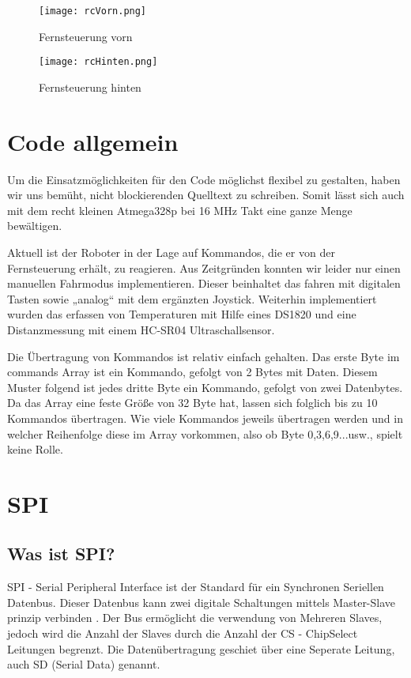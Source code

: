 \documentclass[12pt]{article}
\begin{document}
\begin{figure}[h]
	\texttt{[image: rcVorn.png]}
	\centering
	\caption{Fernsteuerung vorn}
\end{figure}

\begin{figure}[h]
	\texttt{[image: rcHinten.png]}
	\centering
	\caption{Fernsteuerung hinten}
\end{figure}

\newpage
\section{Code allgemein}%

Um die Einsatzmöglichkeiten für den Code möglichst flexibel zu gestalten, haben wir uns bemüht, nicht blockierenden Quelltext zu schreiben.
Somit lässt sich auch mit dem recht kleinen Atmega328p bei 16 MHz Takt eine ganze Menge bewältigen.

Aktuell ist der Roboter in der Lage auf Kommandos, die er von der Fernsteuerung erhält, zu reagieren. Aus Zeitgründen konnten wir leider nur einen manuellen Fahrmodus implementieren. Dieser beinhaltet das fahren mit digitalen Tasten sowie „analog“ mit dem ergänzten Joystick.
Weiterhin implementiert wurden das erfassen von Temperaturen mit Hilfe eines DS1820 und eine Distanzmessung mit einem HC-SR04 Ultraschallsensor.

Die Übertragung von Kommandos ist relativ einfach gehalten. Das erste Byte im commands Array ist ein Kommando, gefolgt von 2 Bytes mit Daten. Diesem Muster folgend ist jedes dritte Byte ein Kommando, gefolgt von zwei Datenbytes.
Da das Array eine feste Größe von 32 Byte hat, lassen sich folglich bis zu 10 Kommandos übertragen. Wie viele Kommandos jeweils übertragen werden und in welcher Reihenfolge diese im Array vorkommen, also ob Byte 0,3,6,9...usw., spielt keine Rolle.

\newpage    
\section{SPI}%
\subsection{Was ist SPI?} %
SPI - Serial Peripheral Interface ist der Standard für ein Synchronen Seriellen Datenbus. Dieser Datenbus kann zwei digitale Schaltungen mittels Master-Slave prinzip verbinden \cite{SPI}. Der Bus ermöglicht die verwendung von Mehreren Slaves, jedoch wird die Anzahl der Slaves durch die Anzahl der CS - ChipSelect Leitungen begrenzt. Die Datenübertragung geschiet über eine Seperate Leitung, auch SD (Serial Data) genannt. 
\end{document}
